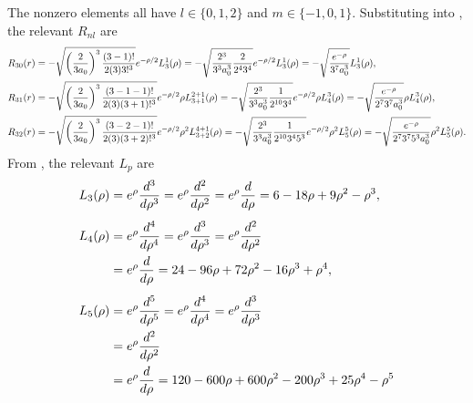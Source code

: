 \begin{solution}
	The nonzero elements all have $l \in \{0, 1, 2\}$ and $m \in \{-1, 0, 1\}$.  Substituting into , the relevant $R_{n l}$ are
	\begin{align*}
		R_{3 0}(r) &= -\sqrt{\left( \frac{2}{3 a_0} \right)^3 \frac{(3 - 1)!}{2 (3) 3!^3}} e^{-\rho / 2} L_3^1(\rho)
		= -\sqrt{\frac{2^3}{3^3 a_0^3} \frac{2}{2^4 3^4}} e^{-\rho / 2} L_3^1(\rho)
		= -\sqrt{\frac{e^{-\rho}}{3^7 a_0^3}} L_3^1(\rho), \\
		R_{3 1}(r) &= -\sqrt{\left( \frac{2}{3 a_0} \right)^3 \frac{(3 - 1 - 1)!}{2 (3) (3 + 1)!^3}} e^{-\rho / 2} \rho L_{3 + 1}^{2 + 1}(\rho)
		= -\sqrt{\frac{2^3}{3^3 a_0^3} \frac{1}{2^{10} 3^4}} e^{-\rho / 2} \rho L_4^3(\rho)
		= -\sqrt{\frac{e^{-\rho}}{2^7 3^7 a_0^3}} \rho L_4^3(\rho), \\
		R_{3 2}(r) &= -\sqrt{\left( \frac{2}{3 a_0} \right)^3 \frac{(3 - 2 - 1)!}{2 (3) (3 + 2)!^3}} e^{-\rho / 2} \rho^2 L_{3 + 2}^{4 + 1}(\rho)
		= -\sqrt{\frac{2^3}{3^3 a_0^3} \frac{1}{2^{10} 3^4 5^3}} e^{-\rho / 2} \rho^2 L_5^5(\rho)
		= -\sqrt{\frac{e^{-\rho}}{2^7 3^7 5^3 a_0^3}} \rho^2 L_5^5(\rho).
	\end{align*}
	From , the relevant $L_p$ are
	\begin{align*}
		L_3(\rho) &= e^\rho \dv[3]{}{\rho} (\rho^3 e^{-\rho})
		= e^\rho \dv[2]{}{\rho} (3 \rho^2 e^{-\rho} - \rho^3 e^{-\rho})
		= e^\rho \dv{}{\rho} (6 \rho e^{-\rho} - 6 \rho^2 e^{-\rho} + \rho^3 e^{-\rho})
		= 6 - 18 \rho + 9 \rho^2 - \rho^3, \\[1ex]
		L_4(\rho) &= e^\rho \dv[4]{}{\rho} (\rho^4 e^{-\rho})
		= e^\rho \dv[3]{}{\rho} (4 \rho^3 e^{-\rho} - \rho^4 e^{-\rho})
		= e^\rho \dv[2]{}{\rho} (12 \rho^2 e^{-\rho} - 8 \rho^3 e^{-\rho} + \rho^4 e^{-\rho}) \\
		&= e^\rho \dv{}{\rho} (24 \rho e^{-\rho} - 36 \rho^2 e^{-\rho} + 12 \rho^3 e^{-\rho} - \rho^4 e^{-\rho})
		= 24 - 96 \rho + 72 \rho^2 - 16 \rho^3 + \rho^4, \\[1ex]
		L_5(\rho) &= e^\rho \dv[5]{}{\rho} (\rho^5 e^{-\rho})
		= e^\rho \dv[4]{}{\rho} (5 \rho^4 e^{-\rho} - \rho^5 e^{-\rho})
		= e^\rho \dv[3]{}{\rho} (20 \rho^3 e^{-\rho} - 10 \rho^4 e^{-\rho} + \rho^5 e^{-\rho}) \\
		&= e^\rho \dv[2]{}{\rho} (60 \rho^2 e^{-\rho} - 60 \rho^3 e^{-\rho} + 15 \rho^4 e^{-\rho} - \rho^5 e^{-\rho}) \\
		&= e^\rho \dv{}{\rho} (120 \rho e^{-\rho} - 240 \rho^2 e^{-\rho} + 120 \rho^3 e^{-\rho} - 20 \rho^4 e^{-\rho} + \rho^5 e^{-\rho})
		= 120 - 600 \rho + 600 \rho^2 - 200 \rho^3 + 25 \rho^4 - \rho^5

\end{align*}
\end{solution}
